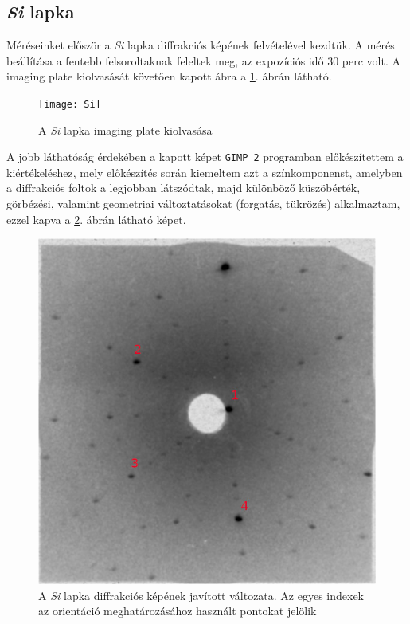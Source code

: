\documentclass[12pt,a4paper]{article}
\begin{document}
\subsection{\emph{Si} lapka}
\hspace*{10pt} Méréseinket először a \emph{Si} lapka diffrakciós képének felvételével kezdtük. A mérés beállítása a fentebb felsoroltaknak feleltek meg, az expozíciós idő 30 perc volt. A imaging plate kiolvasását követően kapott ábra a \ref{si:unproc}. ábrán látható.\\
\begin{figure}[!h]
\centering
\texttt{[image: Si]}
\caption{A \emph{Si} lapka imaging plate kiolvasása}
\label{si:unproc}
\end{figure}
\newpage
A jobb láthatóság érdekében a kapott képet \texttt{GIMP 2} programban előkészítettem a kiértékeléshez, mely előkészítés során kiemeltem azt a színkomponenst, amelyben a diffrakciós foltok a legjobban látszódtak, majd különböző küszöbérték, görbézési, valamint geometriai változtatásokat (forgatás, tükrözés) alkalmaztam, ezzel kapva a \ref{fig:siproc}. ábrán látható képet.\\
\begin{figure}[!h]
\centering
\includegraphics[scale=1.8]{Si_proc}
\caption{A \emph{Si} lapka diffrakciós képének javított változata. Az egyes indexek az orientáció meghatározásához használt pontokat jelölik}
\label{fig:siproc}
\end{figure}
\end{document}
